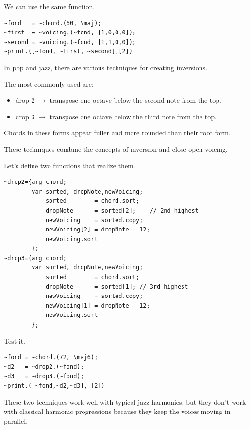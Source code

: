 We can use the same function.

\begin{lstlisting}[frame=single] 
~fond   = ~chord.(60, \maj);                 
~first  = ~voicing.(~fond, [1,0,0,0]); 
~second = ~voicing.(~fond, [1,1,0,0]); 
~print.([~fond, ~first, ~second],[2])
\end{lstlisting}

In pop and jazz, there are various techniques for creating inversions.

The most commonly used are:

\begin{itemize}
\tightlist
\item drop 2 \(\rightarrow\) transpose one octave below the second note from the top.
\item drop 3 \(\rightarrow\) transpose one octave below the third note from the top.
\end{itemize}

Chords in these forms appear fuller and more rounded than their root form.

These techniques combine the concepts of inversion and close-open voicing.

Let's define two functions that realize them.

\begin{lstlisting}[frame=single, caption=drop model functions] 
~drop2={arg chord;
        var sorted, dropNote,newVoicing; 
            sorted        = chord.sort;
            dropNote      = sorted[2];    // 2nd highest
            newVoicing    = sorted.copy;
            newVoicing[2] = dropNote - 12;
            newVoicing.sort 
        };
~drop3={arg chord;
        var sorted, dropNote,newVoicing; 
            sorted        = chord.sort;
            dropNote      = sorted[1]; // 3rd highest
            newVoicing    = sorted.copy;
            newVoicing[1] = dropNote - 12;
            newVoicing.sort 
        };
\end{lstlisting}

Test it.

\begin{lstlisting}[frame=single] 
~fond = ~chord.(72, \maj6);
~d2   = ~drop2.(~fond);
~d3   = ~drop3.(~fond);
~print.([~fond,~d2,~d3], [2])
\end{lstlisting}

These two techniques work well with typical jazz harmonies, but they don't work with classical harmonic progressions because they keep the voices moving in parallel.

